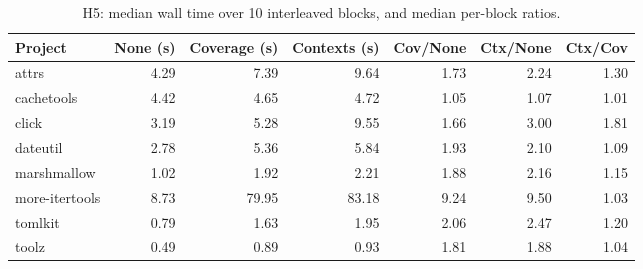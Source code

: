 \begin{table}[t]
\centering\small
\begin{tabular}{lrrrrrr}
\toprule
Project & None (s) & Coverage (s) & Contexts (s) & Cov/None & Ctx/None & Ctx/Cov \\
\midrule
attrs & 4.29 & 7.39 & 9.64 & 1.73 & 2.24 & 1.30 \\
cachetools & 4.42 & 4.65 & 4.72 & 1.05 & 1.07 & 1.01 \\
click & 3.19 & 5.28 & 9.55 & 1.66 & 3.00 & 1.81 \\
dateutil & 2.78 & 5.36 & 5.84 & 1.93 & 2.10 & 1.09 \\
marshmallow & 1.02 & 1.92 & 2.21 & 1.88 & 2.16 & 1.15 \\
more-itertools & 8.73 & 79.95 & 83.18 & 9.24 & 9.50 & 1.03 \\
tomlkit & 0.79 & 1.63 & 1.95 & 2.06 & 2.47 & 1.20 \\
toolz & 0.49 & 0.89 & 0.93 & 1.81 & 1.88 & 1.04 \\
\bottomrule
\end{tabular}
\caption{H5: median wall time over 10 interleaved blocks, and median per-block ratios.}
\label{tab:h5}
\end{table}
